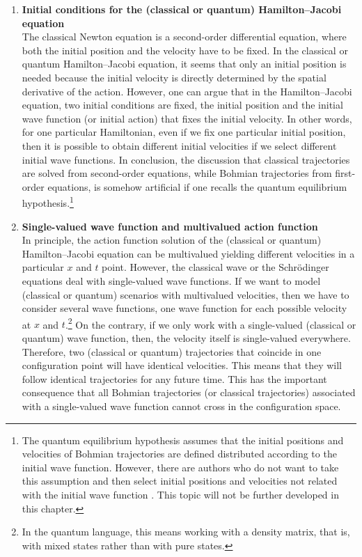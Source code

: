 \documentclass[onecolumn,nofootinbib, secnumarabic, amsmath, nobibnotes,12pt,aps,pra]{revtex4-1}
\begin{document}
\begin{enumerate}
\begin{enumerate}
\item \textbf{Initial conditions for the (classical or quantum)  Hamilton--Jacobi equation} \\ The classical Newton equation is a second-order differential equation, where both the initial position and the velocity have to be fixed. In the classical or quantum Hamilton--Jacobi equation, it seems that only an initial position is needed because the initial velocity is directly determined by the spatial derivative of the action. However, one can argue that in the Hamilton--Jacobi equation, two initial conditions are fixed, the initial position and the initial wave function (or initial action) that fixes the initial velocity. In other words, for one particular Hamiltonian, even if we fix one particular initial position, then it is possible to obtain different initial velocities if we select different initial wave functions. In conclusion, the discussion that classical trajectories are solved from second-order equations, while Bohmian trajectories from first-order equations, is somehow artificial if one recalls the quantum equilibrium hypothesis.\footnote{The quantum equilibrium hypothesis assumes that the initial positions and velocities of Bohmian trajectories are defined distributed according to the initial wave function. However, there are authors who do not want to take this assumption and then select initial positions and velocities not related with the initial wave function \cite{om.extra2,om.extra9,om.Valentini2006,om.nonequilibrium}. This topic will not be further developed in this chapter.}

\item \textbf{Single-valued wave function and multivalued action function} \\ In principle, the action function solution of the (classical or quantum) Hamilton--Jacobi equation can be multivalued yielding different velocities in a particular $x$ and $t$ point. However, the classical wave or the Schr\"odinger equations deal with single-valued wave functions. If we want to model (classical or quantum) scenarios with multivalued velocities, then we have to consider several wave functions, one wave function for each possible velocity at $x$ and $t$.\footnote{In the quantum language, this means working with a density matrix, that is, with mixed states rather than with pure states.} On the contrary, if we only work with a single-valued (classical or quantum) wave function, then, the velocity itself is single-valued everywhere. Therefore, two (classical or quantum) trajectories that coincide in one configuration point will have identical velocities. This means that they will follow identical trajectories for any future time. This has the important consequence that all Bohmian trajectories (or classical trajectories) associated with a single-valued wave function cannot cross in the configuration space.
\end{enumerate}

\end{enumerate}
\end{document}
